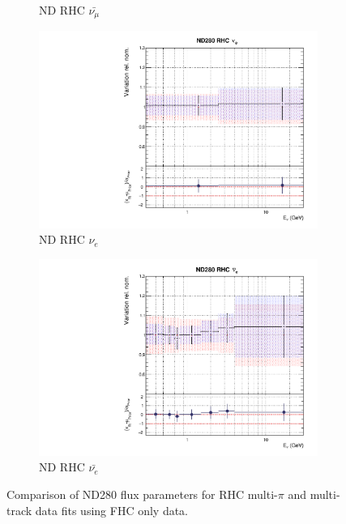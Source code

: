 \begin{figure}[t]
\begin{subfigure}{0.42\textwidth}
  \caption{ND RHC $\bar{\nu_{\mu}}$}
\end{subfigure}
\begin{subfigure}{0.42\textwidth}
  \centering
  \includegraphics[width=0.75\linewidth]{figs/rhcmpdat248flux_6}
  \caption{ND RHC $\nu_{e}$}
\end{subfigure}
\begin{subfigure}{0.42\textwidth}
  \centering
  \includegraphics[width=0.75\linewidth]{figs/rhcmpdat248flux_7}
  \caption{ND RHC $\bar{\nu_e}$}
\end{subfigure}
\caption{Comparison of ND280 flux parameters for RHC multi-$\pi$ and multi-track data fits using FHC only data.}
\label{fig:rhcmpidat248fluxND}
\end{figure}

